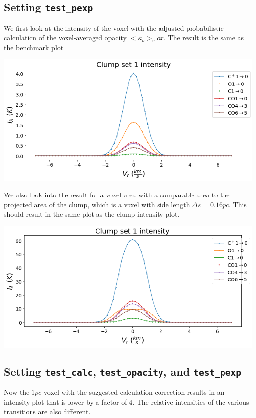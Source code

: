 \documentclass[a4paper]{article}
\begin{document}
    \subsection{Setting \texttt{test\_pexp}}

    We first look at the intensity of the voxel with the adjusted probabilistic calculation of the voxel-averaged opacity \(<\kappa_\nu>_vox\).
    The result is the same as the benchmark plot.

    \includegraphics*[width=\linewidth]{voxel_convergence_fv-pexp.png}

    We also look into the result for a voxel area with a comparable area to the projected area of the clump, which is a voxel with side length \(\Delta s = 0.16 pc\).
    This should result in the same plot as the clump intensity plot.

    \includegraphics*[width=\linewidth]{voxel_single-clump_fv-pexp.png}

    \subsection{Setting \texttt{test\_calc}, \texttt{test\_opacity}, and \texttt{test\_pexp}}

    Now the \(1 pc\) voxel with the suggested calculation correction results in an intensity plot that is lower by a factor of 4.
    The relative intensities of the various transitions are also different.
\end{document}
